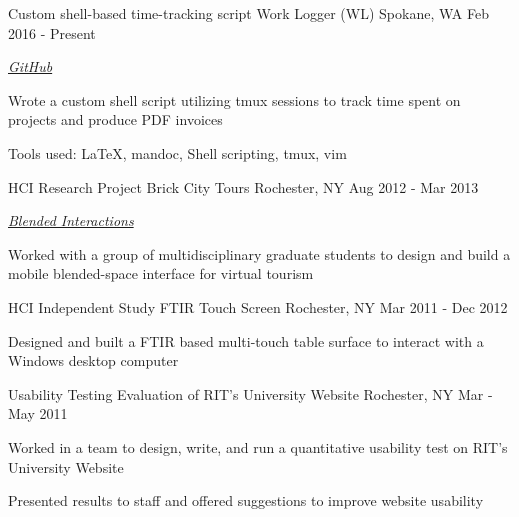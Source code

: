 \begin{cventries}
  \cventry
    {Custom shell-based time-tracking script} %
    {Work Logger (WL)} %
    {Spokane, WA} %
    {Feb 2016 - Present} %
    {
      \begin{cvitems} %
        \item {\emph{\href{https://github.com/desnudopenguino/wl}{GitHub}}}
        \item {Wrote a custom shell script utilizing tmux sessions to track time spent on projects and produce PDF invoices}
        \item {Tools used: LaTeX, mandoc, Shell scripting, tmux, vim}
      \end{cvitems}
    }

  \cventry
    {HCI Research Project} %
    {Brick City Tours} %
    {Rochester, NY} %
    {Aug 2012 - Mar 2013} %
    {
      \begin{cvitems} %
        \item {\emph{\href{https://blendedinteractions.com/projects/brick-city-tours/}{Blended Interactions}}}
        \item {Worked with a group of multidisciplinary graduate students to design and build a mobile blended-space interface for virtual tourism}
      \end{cvitems}
    }

  \cventry
    {HCI Independent Study} %
    {FTIR Touch Screen} %
    {Rochester, NY} %
    {Mar 2011 - Dec 2012} %
    {
      \begin{cvitems} %
        \item {Designed and built a FTIR based multi-touch table surface to interact with a Windows desktop computer}
      \end{cvitems}
    }

  \cventry
    {Usability Testing} %
    {Evaluation of RIT's University Website} %
    {Rochester, NY} %
    {Mar - May 2011} %
    {
      \begin{cvitems} %
        \item {Worked in a team to design, write, and run a quantitative usability test on RIT's University Website}
        \item {Presented results to staff and offered suggestions to improve website usability}
      \end{cvitems}
    }


\end{cventries}
